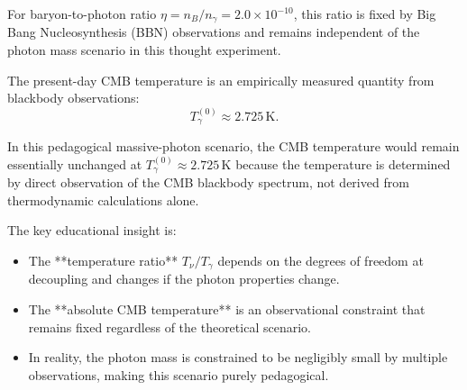 \begin{enumerate}[label=(\alph*)]
  For baryon-to-photon ratio $\eta = n_B/n_\gamma = 2.0 \times 10^{-10}$, this ratio is fixed by Big Bang Nucleosynthesis (BBN) observations and remains independent of the photon mass scenario in this thought experiment.
  
  The present-day CMB temperature is an empirically measured quantity from blackbody observations:
  \[
    T_\gamma^{(0)} \approx 2.725\,\mathrm{K}.
  \]
  
  In this pedagogical massive-photon scenario, the CMB temperature would remain essentially unchanged at $T_{\gamma}^{(0)} \approx 2.725\,\mathrm{K}$ because the temperature is determined by direct observation of the CMB blackbody spectrum, not derived from thermodynamic calculations alone.
  
  The key educational insight is:
  \begin{itemize}
    \item The **temperature ratio** $T_\nu/T_\gamma$ depends on the degrees of freedom at decoupling and changes if the photon properties change.
    \item The **absolute CMB temperature** is an observational constraint that remains fixed regardless of the theoretical scenario.
    \item In reality, the photon mass is constrained to be negligibly small by multiple observations, making this scenario purely pedagogical.
  \end{itemize}

\end{enumerate}


